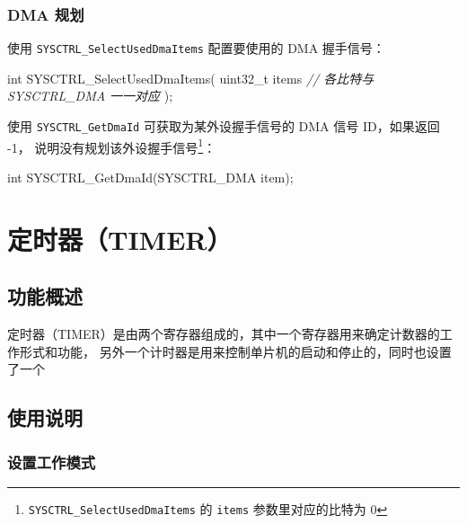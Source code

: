 \documentclass[
  12pt,
]{book}
\newenvironment{Shaded}{\begin{snugshade}}{\end{snugshade}}
\newcommand{\CommentTok}[1]{\textcolor[rgb]{0.56,0.35,0.01}{\textit{#1}}}
\newcommand{\DataTypeTok}[1]{\textcolor[rgb]{0.13,0.29,0.53}{#1}}
\newcommand{\NormalTok}[1]{#1}
\begin{document}
\hypertarget{dma-ux89c4ux5212-1}{%
\subsection{DMA 规划}\label{dma-ux89c4ux5212-1}}

使用 \texttt{SYSCTRL\_SelectUsedDmaItems} 配置要使用的 DMA 握手信号：

\begin{Shaded}
\begin{Highlighting}[]
\DataTypeTok{int}\NormalTok{ SYSCTRL_SelectUsedDmaItems(}
  \DataTypeTok{uint32_t}\NormalTok{ items }\CommentTok{// 各比特与 SYSCTRL_DMA 一一对应}
\NormalTok{  );}
\end{Highlighting}
\end{Shaded}

使用 \texttt{SYSCTRL\_GetDmaId} 可获取为某外设握手信号的 DMA 信号 ID，如果返回 -1，
说明没有规划该外设握手信号\footnote{\texttt{SYSCTRL\_SelectUsedDmaItems} 的 \texttt{items} 参数里对应的比特为 0}：

\begin{Shaded}
\begin{Highlighting}[]
\DataTypeTok{int}\NormalTok{ SYSCTRL_GetDmaId(SYSCTRL_DMA item);}
\end{Highlighting}
\end{Shaded}

\hypertarget{ch-timer}{%
\chapter{定时器（TIMER）}\label{ch-timer}}

\hypertarget{ux529fux80fdux6982ux8ff0-5}{%
\section{功能概述}\label{ux529fux80fdux6982ux8ff0-5}}

定时器（TIMER）是由两个寄存器组成的，其中一个寄存器用来确定计数器的工作形式和功能，
另外一个计时器是用来控制单片机的启动和停止的，同时也设置了一个

\hypertarget{ux4f7fux7528ux8bf4ux660e-6}{%
\section{使用说明}\label{ux4f7fux7528ux8bf4ux660e-6}}

\hypertarget{ux8bbeux7f6eux5de5ux4f5cux6a21ux5f0f}{%
\subsection{设置工作模式}\label{ux8bbeux7f6eux5de5ux4f5cux6a21ux5f0f}}
\end{document}
